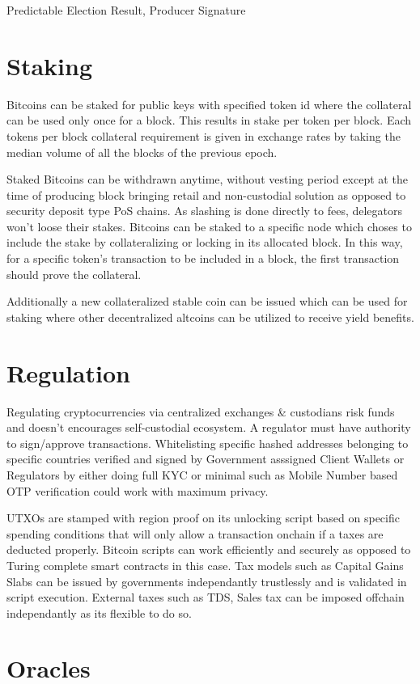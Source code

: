 \documentclass[a4paper,10pt]{article}
\begin{document}
Predictable Election Result, Producer Signature
\section{Staking}
Bitcoins can be staked for public keys with specified token id where the collateral can be used only once for a block. This results in stake per token per block. Each tokens per block collateral requirement is given in exchange rates by taking the median volume of all the blocks of the previous epoch.

Staked Bitcoins can be withdrawn anytime, without vesting period except at the time of producing block bringing retail and non-custodial solution as opposed to security deposit type PoS chains. As slashing is done directly to fees, delegators won't loose their stakes. Bitcoins can be staked to a specific node which choses to include the stake by collateralizing or locking in its allocated block. In this way, for a specific token's transaction to be included in a block, the first transaction should prove the collateral.

 Additionally a new collateralized stable coin can be issued which can be used for staking where other decentralized altcoins can be utilized to receive yield benefits. 
\section{Regulation}
Regulating cryptocurrencies via centralized exchanges \& custodians risk funds and doesn't encourages self-custodial ecosystem. A regulator must have authority to sign/approve transactions. Whitelisting specific hashed addresses belonging to specific countries verified and signed by Government asssigned Client Wallets or Regulators by either doing full KYC or minimal such as Mobile Number based OTP verification could work with maximum privacy. 

UTXOs are stamped with region proof on its unlocking script based on specific spending conditions that will only allow a transaction onchain if a taxes are deducted properly. Bitcoin scripts can work efficiently and securely as opposed to Turing complete smart contracts in this case. Tax models such as Capital Gains Slabs can be issued by governments independantly trustlessly and is validated in script execution. External taxes such as TDS, Sales tax can be imposed offchain independantly as its flexible to do so.
\section{Oracles}
\end{document}
